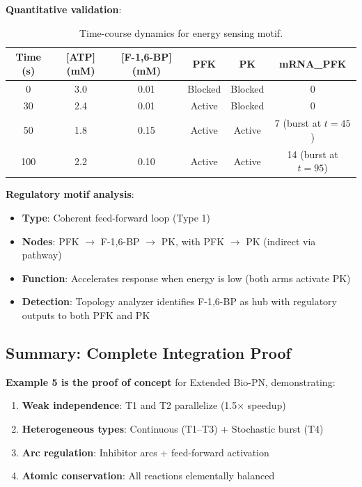 \textbf{Quantitative validation}:

\begin{table}[htbp]
\centering
\caption{Time-course dynamics for energy sensing motif.}
\label{tab:energy-dynamics}
\begin{tabular}{cccccc}
\toprule
\textbf{Time (s)} & \textbf{[ATP] (mM)} & \textbf{[F-1,6-BP] (mM)} & \textbf{PFK} & \textbf{PK} & \textbf{mRNA\_PFK} \\
\midrule
0   & 3.0 & 0.01 & Blocked & Blocked & 0 \\
30  & 2.4 & 0.01 & Active  & Blocked & 0 \\
50  & 1.8 & 0.15 & Active  & Active  & 7 (burst at $t=45$) \\
100 & 2.2 & 0.10 & Active  & Active  & 14 (burst at $t=95$) \\
\bottomrule
\end{tabular}
\end{table}

\textbf{Regulatory motif analysis}:

\begin{itemize}
    \item \textbf{Type}: Coherent feed-forward loop (Type 1)
    \item \textbf{Nodes}: PFK $\to$ F-1,6-BP $\to$ PK, with PFK $\to$ PK (indirect via pathway)
    \item \textbf{Function}: Accelerates response when energy is low (both arms activate PK)
    \item \textbf{Detection}: Topology analyzer identifies F-1,6-BP as hub with regulatory outputs to both PFK and PK
\end{itemize}

\subsection{Summary: Complete Integration Proof}
\label{subsec:energy-summary}

\textbf{Example 5 is the proof of concept} for Extended Bio-PN, demonstrating:

\begin{enumerate}
    \item \checkmark \textbf{Weak independence}: T1 and T2 parallelize (1.5$\times$ speedup)
    \item \checkmark \textbf{Heterogeneous types}: Continuous (T1--T3) + Stochastic burst (T4)
    \item \checkmark \textbf{Arc regulation}: Inhibitor arcs + feed-forward activation
    \item \checkmark \textbf{Atomic conservation}: All reactions elementally balanced
\end{enumerate}

